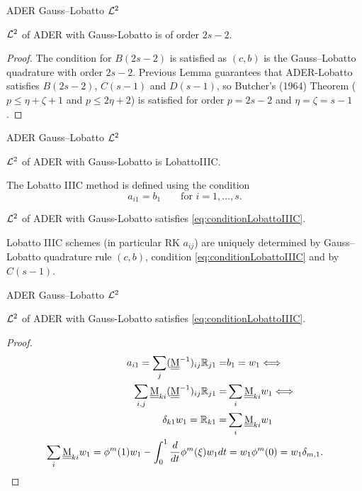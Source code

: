 \documentclass[aspectratio=169]{beamer}
\begin{document}
\begin{frame}{ADER Gauss--Lobatto $\mathcal{L}^2$}
	\begin{theorem}
		$\mathcal{L}^2$ of ADER with Gauss-Lobatto is of order $2s-2$.
	\end{theorem}
	\begin{proof}
		The condition for $B(2s-2)$ is satisfied as $(c,b)$ is the Gauss--Lobatto quadrature 
		with order $2s-2$.
		Previous Lemma  guarantees that ADER-Lobatto satisfies $B(2s-2)$, $C(s-1)$ and $D(s-1)$, 
		so Butcher's (1964) Theorem  ($p\leq \eta +\zeta +1$ and $p\leq 2\eta +2$) is satisfied
		for order $p=2s-2$ and $\eta = \zeta=s-1$.
	\end{proof}	
\end{frame}
\begin{frame}{ADER Gauss--Lobatto $\mathcal{L}^2$}
	\begin{theorem}
		$\mathcal{L}^2$ of ADER with Gauss-Lobatto is LobattoIIIC.
	\end{theorem}

	The Lobatto IIIC method is defined using the condition
	\begin{equation}\label{eq:conditionLobattoIIIC}
		a_{i1}=b_1 \qquad \text{for }i=1,\dots,s.
	\end{equation}


\begin{lemma}\label{lem:conditionLobattoIIIC}
	$\mathcal{L}^2$ of ADER with Gauss-Lobatto satisfies \eqref{eq:conditionLobattoIIIC}.
\end{lemma}
	\begin{theorem}[Chipman 1971]\label{th:uniquenessLobatto}
		Lobatto IIIC schemes (in particular RK $a_{ij}$) are uniquely determined 
		by Gauss--Lobatto quadrature rule $(c,b)$, condition \eqref{eq:conditionLobattoIIIC} 
		and by $C(s-1)$. 
	\end{theorem}
	
\end{frame}

\begin{frame}{ADER Gauss--Lobatto $\mathcal{L}^2$}
	\begin{lemma}\label{lem:conditionLobattoIIIC}
		$\mathcal{L}^2$ of ADER with Gauss-Lobatto satisfies \eqref{eq:conditionLobattoIIIC}.
	\end{lemma}
	\begin{proof}
		\begin{align*}
			a_{i1}=\sum_j (\underline{\underline{\mathrm{M}}}^{-1})_{ij}\mathbb{R}_{j1}=&b_1 = w_1 \Longleftrightarrow	\\
			\sum_{i,j}\underline{\underline{\mathrm{M}}}_{ki}(\underline{\underline{\mathrm{M}}}^{-1})_{ij}\mathbb{R}_{j1}=&\sum_i \underline{\underline{\mathrm{M}}}_{ki}w_1 \Longleftrightarrow \\
			\delta_{k1}w_1=\mathbb{R}_{k1}=&\sum_i \underline{\underline{\mathrm{M}}}_{ki}w_1\\
			\sum_i \underline{\underline{\mathrm{M}}}_{ki}w_1=\phi^m(1) w_1 -  \int_0^1 \frac{d}{dt}\phi^m(\xi)  
			 w_1 dt  &= w_1 \phi^m(0)  = w_1 \delta_{m,1}.
		\end{align*}
		
	\end{proof}
\end{frame}
\end{document}

